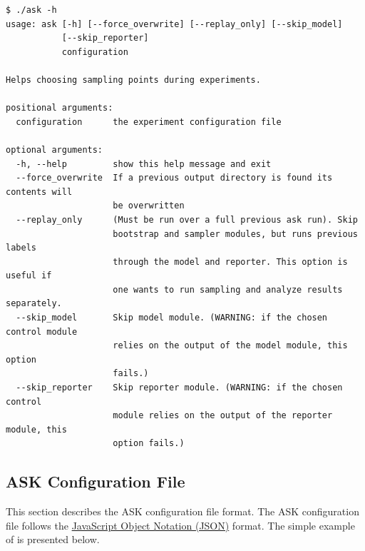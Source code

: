 \begin{verbatim}
$ ./ask -h
usage: ask [-h] [--force_overwrite] [--replay_only] [--skip_model]
           [--skip_reporter]
           configuration

Helps choosing sampling points during experiments.

positional arguments:
  configuration      the experiment configuration file

optional arguments:
  -h, --help         show this help message and exit
  --force_overwrite  If a previous output directory is found its contents will
                     be overwritten
  --replay_only      (Must be run over a full previous ask run). Skip
                     bootstrap and sampler modules, but runs previous labels
                     through the model and reporter. This option is useful if
                     one wants to run sampling and analyze results separately.
  --skip_model       Skip model module. (WARNING: if the chosen control module
                     relies on the output of the model module, this option
                     fails.)
  --skip_reporter    Skip reporter module. (WARNING: if the chosen control
                     module relies on the output of the reporter module, this
                     option fails.)
\end{verbatim}

\subsection{ASK Configuration File}

This section describes the ASK configuration file format. The ASK configuration file follows the \href{http://www.json.org/}{JavaScript Object Notation (JSON)} format. The simple example of  is presented below.

